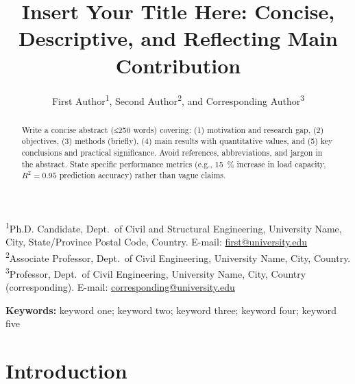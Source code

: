 \documentclass[12pt]{article}
\title{%
  Insert Your Title Here: Concise, Descriptive, and Reflecting Main Contribution
}
\author{
  First Author\textsuperscript{1},
  Second Author\textsuperscript{2}, and
  Corresponding Author\textsuperscript{3}
}
\date{}
\begin{document}
\maketitle

\noindent
\textsuperscript{1}Ph.D. Candidate, Dept.\ of Civil and Structural Engineering,
University Name, City, State/Province Postal Code, Country.
E-mail: \href{mailto:first@university.edu}{first@university.edu} \\[2pt]
\textsuperscript{2}Associate Professor, Dept.\ of Civil Engineering,
University Name, City, Country. \\[2pt]
\textsuperscript{3}Professor, Dept.\ of Civil Engineering, University Name,
City, Country (corresponding). E-mail: \href{mailto:corresponding@university.edu}{corresponding@university.edu}

\bigskip

\begin{abstract}
\noindent
Write a concise abstract (≤250 words) covering: (1) motivation and research gap,
(2) objectives, (3) methods (briefly), (4) main results with quantitative values,
and (5) key conclusions and practical significance.
Avoid references, abbreviations, and jargon in the abstract.
State specific performance metrics (e.g., \SI{15}{\percent} increase in load capacity,
$R^2 = 0.95$ prediction accuracy) rather than vague claims.
\end{abstract}

\noindent\textbf{Keywords:} keyword one; keyword two; keyword three;
keyword four; keyword five

\newpage

\section{Introduction}
\end{document}
